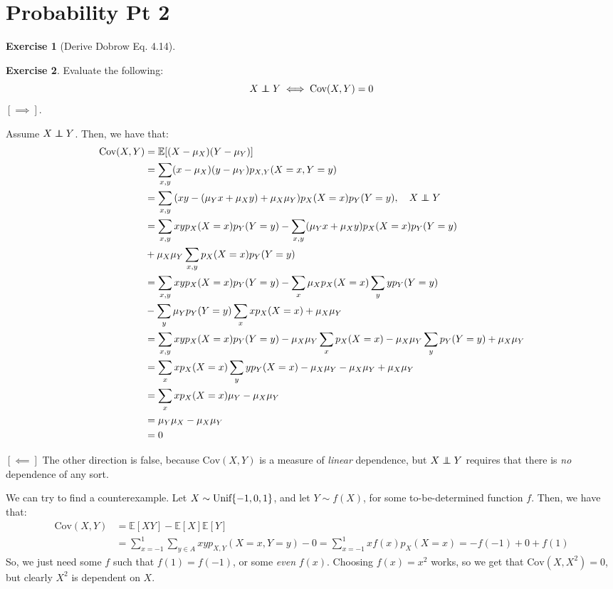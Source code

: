 \documentclass{article}
\theoremstyle{definition}
\newtheorem{exercise}{Exercise}[section]
\newcommand\independent{\protect\mathpalette{\protect\independenT}{\perp}}
\def\independenT#1#2{\mathrel{\rlap{$#1#2$}\mkern2mu{#1#2}}}
\newcommand{\E}{\mathbb{E}}
\newcommand{\Cov}{\text{Cov}}
\begin{document}
\section{Probability Pt 2}
\begin{exercise}[Derive Dobrow Eq. 4.14]
\end{exercise}
\begin{exercise}
Evaluate the following:
\begin{equation}
X\independent Y\iff \Cov(X,Y) = 0
\end{equation}
$[\implies]$.

Assume $X\independent Y$.
Then, we have that:
\begin{align*}
\Cov(X,Y) &= \E[(X-\mu_X)(Y-\mu_Y)] \\
& = \sum_{x,y} (x-\mu_X)(y-\mu_Y)p_{X,Y}(X =x ,Y = y) \\
& = \sum_{x,y} \pqty{xy- (\mu_Yx+\mu_Xy)+\mu_X\mu_Y }p_X(X = x)p_Y(Y = y),\quad X\independent Y \\
& = \sum_{x,y}xyp_X(X = x)p_Y(Y = y) -\sum_{x,y}(\mu_Yx+\mu_Xy)p_X(X = x)p_Y(Y = y) \\
&+\mu_X\mu_Y\sum_{x,y} p_X(X = x)p_Y(Y = y) \\
& = \sum_{x,y}xyp_X(X = x)p_Y(Y = y) - \sum_x \mu_Xp_X(X = x)\sum_y yp_Y(Y=  y) \\
&-\sum_y \mu_Yp_Y(Y = y)\sum_x xp_X(X = x) + \mu_X\mu_Y \\
& = \sum_{x,y} xyp_X(X = x)p_Y(Y = y) -\mu_X\mu_Y\sum_x p_X(X = x) - \mu_X\mu_Y\sum_y p_Y(Y = y) + \mu_X\mu_Y \\
&= \sum_x x p_X(X =x )\sum_y yp_Y(X = x) - \mu_X\mu_Y-\mu_X\mu_Y+\mu_X\mu_Y \\
& = \sum_x xp_X(X = x)\mu_Y -\mu_X\mu_Y \\
& = \mu_Y\mu_X - \mu_X\mu_Y \\
& = 0
\end{align*}

$[\impliedby]$
The other direction is false, because $\Cov(X,Y)$ is a measure of \emph{linear} dependence, but $X\independent Y$ requires that there is \emph{no} dependence of any sort.

We can try to find a counterexample.
Let $X\sim\text{Unif}\Bqty{-1,0,1}$, and let $Y\sim f(X)$, for some to-be-determined function $f$.
Then, we have that:
\begin{align*}
\Cov(X,Y) &= \E[XY] - \E[X]\E[Y] \\
& = \sum_{x = -1}^1\sum_{y \in A} xyp_{X,Y}(X = x,Y = y) - 0 = \sum_{x = -1}^1 xf(x)p_{X}(X = x) = -f(-1) + 0 + f(1)
\end{align*}
So, we just need some $f$ such that $f(1) = f(-1)$, or some \emph{even} $f(x)$.
Choosing $f(x) = x^2$ works, so we get that $\Cov(X,X^2)= 0$, but clearly $X^2$ is dependent on $X$.


\end{exercise}
\end{document}
